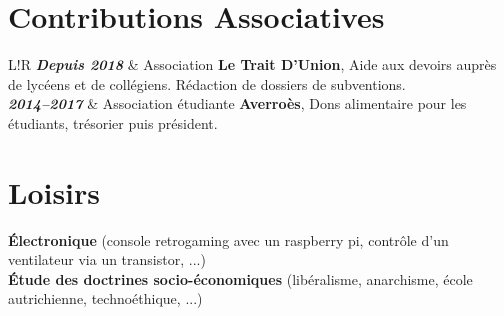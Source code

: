 \documentclass[10pt]{article}
\newcommand\VRule{\color{lightgray}\vrule width 2pt}
\begin{document}
\section*{Contributions Associatives}
\begin{tabular}{L!{\VRule}R}
\textbf{\textit{Depuis 2018}} & Association \textbf{Le Trait D’Union}, Aide aux devoirs auprès de lycéens et de collégiens. Rédaction de dossiers de subventions. \\[0.75cm]

\textbf{\textit{2014--2017}} & Association étudiante \textbf{Averroès}, Dons alimentaire pour les étudiants, trésorier puis président. \\
\end{tabular}
\section*{Loisirs}
\hspace*{1ex} \textbf{Électronique} (console retrogaming avec un raspberry pi, contrôle d'un ventilateur via un transistor, ...) \\
\hspace*{1ex} \textbf{Étude des doctrines socio-économiques} (libéralisme, anarchisme, école autrichienne, technoéthique, ...) \\
\end{document}
